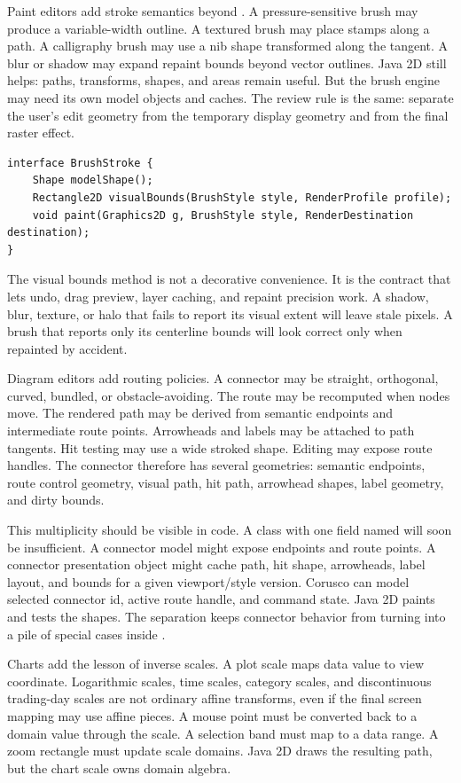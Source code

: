 Paint editors add stroke semantics beyond . A pressure-sensitive brush may produce a variable-width outline. A textured brush may place stamps along a path. A calligraphy brush may use a nib shape transformed along the tangent. A blur or shadow may expand repaint bounds beyond vector outlines. Java 2D still helps: paths, transforms, shapes, and areas remain useful. But the brush engine may need its own model objects and caches. The review rule is the same: separate the user's edit geometry from the temporary display geometry and from the final raster effect.

\begin{lstlisting}[caption={Brush effects must report visual extent for repaint.}]
interface BrushStroke {
    Shape modelShape();
    Rectangle2D visualBounds(BrushStyle style, RenderProfile profile);
    void paint(Graphics2D g, BrushStyle style, RenderDestination destination);
}
\end{lstlisting}

The visual bounds method is not a decorative convenience. It is the contract that lets undo, drag preview, layer caching, and repaint precision work. A shadow, blur, texture, or halo that fails to report its visual extent will leave stale pixels. A brush that reports only its centerline bounds will look correct only when repainted by accident.

Diagram editors add routing policies. A connector may be straight, orthogonal, curved, bundled, or obstacle-avoiding. The route may be recomputed when nodes move. The rendered path may be derived from semantic endpoints and intermediate route points. Arrowheads and labels may be attached to path tangents. Hit testing may use a wide stroked shape. Editing may expose route handles. The connector therefore has several geometries: semantic endpoints, route control geometry, visual path, hit path, arrowhead shapes, label geometry, and dirty bounds.

This multiplicity should be visible in code. A class with one field named  will soon be insufficient. A connector model might expose endpoints and route points. A connector presentation object might cache path, hit shape, arrowheads, label layout, and bounds for a given viewport/style version. Corusco can model selected connector id, active route handle, and command state. Java 2D paints and tests the shapes. The separation keeps connector behavior from turning into a pile of special cases inside .

Charts add the lesson of inverse scales. A plot scale maps data value to view coordinate. Logarithmic scales, time scales, category scales, and discontinuous trading-day scales are not ordinary affine transforms, even if the final screen mapping may use affine pieces. A mouse point must be converted back to a domain value through the scale. A selection band must map to a data range. A zoom rectangle must update scale domains. Java 2D draws the resulting path, but the chart scale owns domain algebra.

